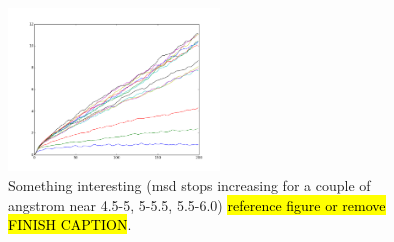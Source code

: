 \begin{figure}[htpb]%
    \centering%
    \includegraphics[width=0.5\textwidth]{images/diffusion/mean_square_displacement_interesting.png}%
    \caption{%
        Something interesting (msd stops increasing for a couple of angstrom near 4.5-5, 5-5.5, 5.5-6.0) \hl{reference figure or remove} \hl{FINISH CAPTION}. %
    }%
\end{figure}%

